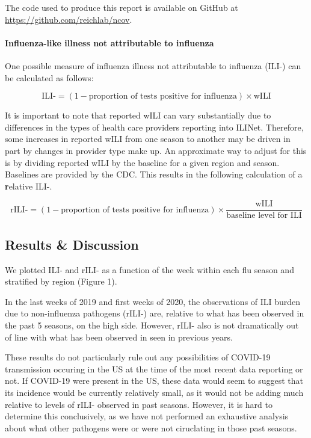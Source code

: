 \documentclass[]{article}
\let\oldparagraph\paragraph
\renewcommand{\paragraph}[1]{\oldparagraph{#1}\mbox{}}
\begin{document}
The code used to produce this report is available on GitHub at
\url{https://github.com/reichlab/ncov}.

\hypertarget{influenza-like-illness-not-attributable-to-influenza}{%
\paragraph{Influenza-like illness not attributable to
influenza}\label{influenza-like-illness-not-attributable-to-influenza}}

One possible measure of influenza illness not attributable to influenza
(ILI-) can be calculated as follows:

\[\text{ILI-} = (1 - \text{proportion of tests positive for influenza}) \times \text{wILI}\]

It is important to note that reported wILI can vary substantially due to
differences in the types of health care providers reporting into ILINet.
Therefore, some increases in reported wILI from one season to another
may be driven in part by changes in provider type make up. An
approximate way to adjust for this is by dividing reported wILI by the
baseline for a given region and season. Baselines are provided by the
CDC. This results in the following calculation of a \textbf{r}elative
ILI-.

\[\text{rILI-} = (1 - \text{proportion of tests positive for influenza}) \times \frac{\text{wILI}}{\text{baseline level for ILI}}\]

\hypertarget{results-discussion}{%
\subsection{Results \& Discussion}\label{results-discussion}}

We plotted ILI- and rILI- as a function of the week within each flu
season and stratified by region (Figure 1).

In the last weeks of 2019 and first weeks of 2020, the observations of
ILI burden due to non-influenza pathogens (rILI-) are, relative to what
has been observed in the past 5 seasons, on the high side. However,
rILI- also is not dramatically out of line with what has been observed
in seen in previous years.

These results do not particularly rule out any possibilities of COVID-19
transmission occuring in the US at the time of the most recent data
reporting or not. If COVID-19 were present in the US, these data would
seem to suggest that its incidence would be currently relatively small,
as it would not be adding much relative to levels of rILI- observed in
past seasons. However, it is hard to determine this conclusively, as we
have not performed an exhaustive analysis about what other pathogens
were or were not ciruclating in those past seasons.
\end{document}
